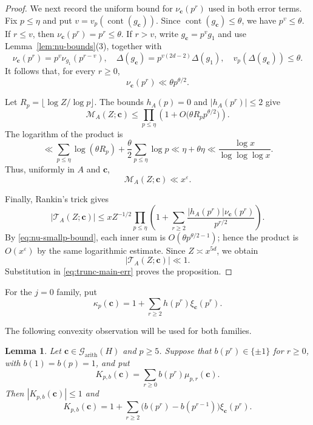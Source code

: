 \documentclass[12pt,reqno]{amsart}
\numberwithin{equation}{section}
\newtheorem{lemma}[theorem]{Lemma}
\theoremstyle{definition}
\renewcommand{\le}{\leqslant}
\renewcommand{\ge}{\geqslant}
\newcommand{\cc}{\mathbf{c}}
\DeclareMathOperator{\cont}{cont}
\begin{document}
\begin{proof}
We next record the uniform bound for $\nu_\cc(p^r)$ used in both error terms.
Fix $p\le\eta$ and put $v=v_p(\cont(g_\cc))$.
Since $\cont(g_\cc)\le\theta$, we have $p^v\le\theta$.
If $r\le v$, then $\nu_\cc(p^r)=p^r\le\theta$.
If $r>v$, write $g_\cc=p^v g_1$ and use Lemma~\ref{lem:nu-bounds}(3), together with
\[
\nu_\cc(p^r)=p^v\nu_{g_1}(p^{r-v}),\quad
\Delta(g_\cc)=p^{v(2d-2)}\Delta(g_1),\quad
v_p(\Delta(g_\cc))\le\theta.
\]
It follows that, for every $r\ge0$,
\begin{equation}\label{eq:nu-smallp-bound}
\nu_\cc(p^r)\ll\theta p^{\theta/2}.
\end{equation}

Let $R_p=\lfloor\log Z/\log p\rfloor$.
The bounds $h_A(p)=0$ and $|h_A(p^r)|\le2$ give
\[
\mathcal M_A(Z;\cc)
\le\prod_{p\le\eta}
\left(1+O\bigl(\theta R_p p^{\theta/2}\bigr)\right).
\]
The logarithm of the product is
\[
\ll\sum_{p\le\eta}\log(\theta R_p)
+\frac{\theta}{2}\sum_{p\le\eta}\log p
\ll\eta+\theta\eta
\ll\frac{\log x}{\log\log\log x}.
\]
Thus, uniformly in $A$ and $\cc$,
\begin{equation}\label{eq:E2-bound}
\mathcal M_A(Z;\cc)\ll x^\varepsilon.
\end{equation}

Finally, Rankin's trick gives
\begin{equation}\label{eq:large-prime-tail-rankin}
|\mathcal T_A(Z;\cc)|
\le xZ^{-1/2}\prod_{p\le\eta}
\left(1+\sum_{r\ge2}
\frac{|h_A(p^r)|\nu_\cc(p^r)}{p^{r/2}}\right).
\end{equation}
By \eqref{eq:nu-smallp-bound}, each inner sum is $O(\theta p^{\theta/2-1})$; hence the product is $O(x^\varepsilon)$ by the same logarithmic estimate.
Since $Z\asymp x^{5d}$, we obtain
\begin{equation}\label{eq:large-prime-tail-bound}
|\mathcal T_A(Z;\cc)|\ll1.
\end{equation}
Substitution in \eqref{eq:trunc-main-err} proves the proposition.
\end{proof}

For the $j=0$ family, put
\begin{equation}\label{eq:kappa-p-def}
\kappa_p(\cc)=1+\sum_{r\ge2}h(p^r)\xi_\cc(p^r).
\end{equation}

The following convexity observation will be used for both families.

\begin{lemma}\label{lem:local-convexity}
Let $\cc\in\mathcal G_{\mathrm{arith}}(H)$ and $p\ge5$.
Suppose that $b(p^r)\in\{\pm1\}$ for $r\ge0$, with $b(1)=b(p)=1$, and put
\[
K_{p,b}(\cc)=\sum_{r\ge0}b(p^r)\mu_{p,r}(\cc).
\]
Then $|K_{p,b}(\cc)|\le1$ and
\begin{equation}\label{eq:local-convexity}
K_{p,b}(\cc)
=1+\sum_{r\ge2}
\bigl(b(p^r)-b(p^{r-1})\bigr)\xi_\cc(p^r).
\end{equation}
\end{lemma}
\end{document}
